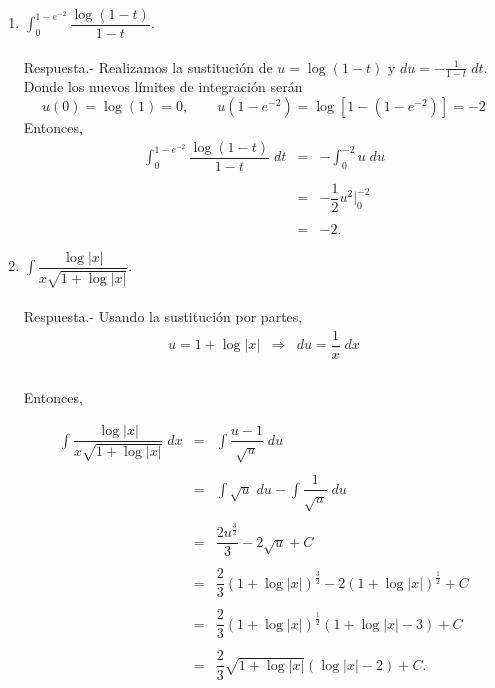 \begin{enumerate}[\bfseries 1.]
    \item $\displaystyle\int_0^{1-e^{-2}} \dfrac{\log(1-t)}{1-t}$.\\\\
	Respuesta.-\; Realizamos la sustitución de $u=\log(1-t)$ y $du=-\frac{1}{1-t}\; dt$. Donde los nuevos límites de integración serán
	$$u(0)=\log(1)=0,\qquad u\left(1-e^{-2}\right)=\log\left[1-\left(1-e^{-2}\right)\right]=-2$$
	Entonces,
	$$
	\begin{array}{rcl}
	    \displaystyle\int_0^{1-e^{-2}} \dfrac{\log(1-t)}{1-t}\; dt &=& -\displaystyle\int_{0}^{-2} u\; du\\\\
								       &=& -\dfrac{1}{2} u^2 \bigg|_{0}^{-2}\\\\
								       &=& -2.
	\end{array}
	$$
	\vspace{.5cm}

    \item $\displaystyle\int \dfrac{\log|x|}{x\sqrt{1+\log|x|}}$.\\\\
	Respuesta.-\; Usando la sustitución por partes,
	$$
	\begin{array}{rcl}
	    u=1+\log|x| &\Rightarrow& du=\dfrac{1}{x}\; dx\\\\
	\end{array}
	$$

	Entonces,

	$$
	\begin{array}{rcl}
	    \displaystyle\int \dfrac{\log|x|}{x\sqrt{1+\log|x|}}\; dx &=& \displaystyle\int \dfrac{u-1}{\sqrt{u}}\; du\\\\
								      &=& \displaystyle\int \sqrt{u}\; du - \int \dfrac{1}{\sqrt{u}}\; du\\\\
								      &=& \dfrac{2u^{\frac{3}{2}}}{3}-2\sqrt{u}+C\\\\
								      &=& \dfrac{2}{3}(1+\log|x|)^{\frac{3}{2}}-2\left(1+\log|x|\right)^{\frac{1}{2}}+C\\\\
								      &=& \dfrac{2}{3}(1+\log|x|)^{\frac{1}{2}} \left(1+\log|x|-3\right)+C\\\\
								      &=& \dfrac{2}{3}\sqrt{1+\log|x|}\left(\log|x|-2\right)+C.
	\end{array}
	$$
	\vspace{.5cm}


\end{enumerate}
